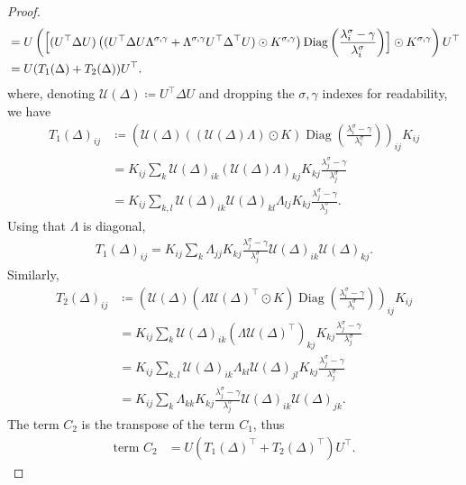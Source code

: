 \documentclass[11pt]{article}
\newcommand{\eqdef}{\coloneqq}
\newcommand{\diag}[1]{\operatorname{Diag}\left({#1}\right)}
\begin{document}
\begin{proof}
\begin{align*}
&= U \left( \Bigl[ ( U^{\top} \Delta U) \left(  (  U^{\top} \Delta U \Lambda^{\sigma, \gamma} + \Lambda^{\sigma, \gamma} U^{\top} \Delta^\top U) \odot  K^{\sigma, \gamma}\right) \diag{\frac{\lambda^\sigma_i - \gamma}{\lambda^\sigma_i }}
\Bigr] \odot K^{\sigma, \gamma} \right)U^{\top}  \\
&= U ( T_1(\Delta) + T_2(\Delta) ) U^\top.
\end{align*}
where, denoting $ \mathcal{U}(\Delta) \eqdef  U^{\top} \Delta U$ and dropping the $\sigma,\gamma$ indexes for readability, we have
\begin{align*}
T_1(\Delta)_{ij} &\eqdef \left(\mathcal{U}(\Delta)\left( \left(\mathcal{U}(\Delta) \Lambda \right) \odot K \right) \diag{\frac{\lambda^\sigma_i - \gamma}{\lambda^\sigma_i }} \right)_{ij}  K_{ij} \\
&= K_{ij} \sum_{k} \mathcal{U}(\Delta)_{ik} (\mathcal{U}(\Delta) \Lambda)_{kj} K_{kj} \frac{\lambda^\sigma_j - \gamma}{\lambda^\sigma_j } \\
&=  K_{ij} \sum_{k,l} \mathcal{U}(\Delta)_{ik} \mathcal{U}(\Delta)_{kl} \Lambda_{lj} K_{kj} \frac{\lambda^\sigma_j - \gamma}{\lambda^\sigma_j } .
\end{align*}
Using that $\Lambda$ is diagonal, 
\begin{align*}
T_1(\Delta)_{ij} =  K_{ij} \sum_{k} \Lambda_{jj} K_{kj} \frac{\lambda^\sigma_j - \gamma}{\lambda^\sigma_j } \mathcal{U}(\Delta)_{ik} \mathcal{U}(\Delta)_{kj}  .
\end{align*}
Similarly, 
\begin{align*}
T_2(\Delta)_{ij} &\eqdef  \left(\mathcal{U}(\Delta)( \Lambda \mathcal{U}(\Delta)^\top \odot K) \diag{\frac{\lambda^\sigma_i - \gamma}{\lambda^\sigma_i }} \right)_{ij}  K_{ij} \\
&=  K_{ij}\sum_{k} \mathcal{U}(\Delta)_{ik} ( \Lambda \mathcal{U}(\Delta)^\top)_{kj} K_{kj}\frac{\lambda^\sigma_j - \gamma}{\lambda^\sigma_j } \\
&=  K_{ij}\sum_{k,l} \mathcal{U}(\Delta)_{ik} \Lambda_{kl} \mathcal{U}(\Delta)_{jl}  K_{kj}\frac{\lambda^\sigma_j - \gamma}{\lambda^\sigma_j } \\
&=  K_{ij}\sum_{k} \Lambda_{kk}  K_{kj} \frac{\lambda^\sigma_j - \gamma}{\lambda^\sigma_j }\mathcal{U}(\Delta)_{ik} \mathcal{U}(\Delta)_{jk} .
\end{align*}
The term $C_2$ is the transpose of the term $C_1$, thus
\begin{align*}
\text{term } C_2 &= U ( T_1(\Delta)^\top + T_2(\Delta)^\top ) U^\top.
\end{align*}

\end{proof}
\end{document}
